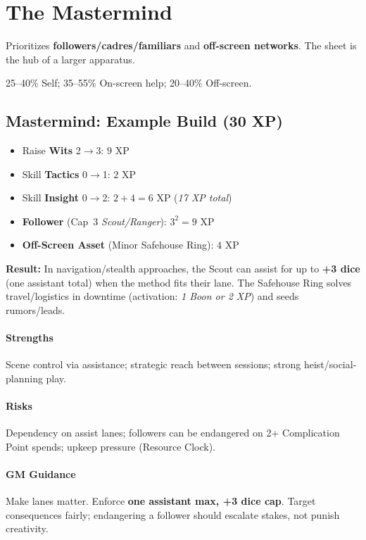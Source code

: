 \documentclass[12pt]{article}
\begin{document}
\section{The Mastermind}
\begin{description}[leftmargin=2cm]
  \item[Definition:] Prioritizes \textbf{followers/cadres/familiars} and \textbf{off-screen networks}. The sheet is the hub of a larger apparatus.
  \item[Typical XP Spread:] 25--40\% Self; 35--55\% On-screen help; 20--40\% Off-screen.
\end{description}

\subsection*{Mastermind: Example Build (30 XP)}
\begin{itemize}
  \item Raise \textbf{Wits} 2$\rightarrow$3: $9$ XP
  \item Skill \textbf{Tactics} 0$\rightarrow$1: $2$ XP
  \item Skill \textbf{Insight} 0$\rightarrow$2: $2+4=6$ XP \hfill (\emph{17 XP total})
  \item \textbf{Follower} (Cap~3 \emph{Scout/Ranger}): $3^2=9$ XP
  \item \textbf{Off-Screen Asset} (Minor Safehouse Ring): $4$ XP
\end{itemize}

\textbf{Result:} In navigation/stealth approaches, the Scout can assist for up to \textbf{+3 dice} (one assistant total) when the method fits their lane.  
The Safehouse Ring solves travel/logistics in downtime (activation: \emph{1 Boon or 2 XP}) and seeds rumors/leads.

\paragraph{Strengths} Scene control via assistance; strategic reach between sessions; strong heist/social-planning play.  
\paragraph{Risks} Dependency on assist lanes; followers can be endangered on 2+ Complication Point spends; upkeep pressure (Resource Clock).  
\paragraph{GM Guidance} Make lanes matter. Enforce \textbf{one assistant max, +3 dice cap}. Target consequences fairly; endangering a follower should escalate stakes, not punish creativity.
\end{document}
